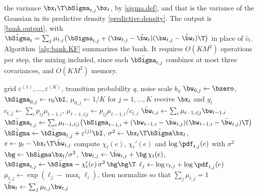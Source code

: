 the variance $\bx_t\T\tilde{\bSigma}_{t,j}\bx_t$, by
\eqref{sigma.def}, and that is the variance of the Gaussian in its
predictive density \eqref{predictive.density}. The output
is \eqref{bank.output}, with
$\hat{\bSigma}_t = \sum_j \mu_{t,j}\big(\bSigma_{t,j}
+ (\bw_{t,j} - \hat{\bw}_t)(\bw_{t,j} - \hat{\bw}_t)\T\big)$
in place of $\hat{v}_t$. Algorithm~\ref{alg:bank.KF} summarizes the
bank. It requires $O(KM^2)$ operations per step, the mixing
included, since each $\bar{\bSigma}_{t,j}$ combines at most three
covariances, and $O(KM^2)$ memory.

\begin{algorithm}[t]
\caption{Bank of KF filters with uncertain random-walk variance}
\label{alg:bank.KF}
\begin{algorithmic}[1]
\Require grid $\varepsilon^{(1)}, \ldots, \varepsilon^{(K)}$,
         transition probability $q$, noise scale $b_\eta$
\State $\bw_{0,j} \gets \bzero$, $\bSigma_{0,j} \gets v_0\bI$,
       $\mu_{0,j} \gets 1/K$ for $j = 1, \ldots, K$
  \State receive $\bx_t$ and $y_t$
    \State $c_{t,j} \gets \sum_i p_{ij}\mu_{t-1,i}$,\;
           $\mu_{t-1,i|j} \gets p_{ij}\mu_{t-1,i}/c_{t,j}$
    \State $\bar{\bw}_{t,j} \gets \sum_i \mu_{t-1,i|j}\bw_{t-1,i}$
    \State $\bar{\bSigma}_{t,j} \gets \sum_i \mu_{t-1,i|j}
           \big(\bSigma_{t-1,i}
           + (\bw_{t-1,i}-\bar{\bw}_{t,j})(\bw_{t-1,i}-\bar{\bw}_{t,j})\T\big)$
  \EndFor
    \State $\tilde{\bSigma} \gets \bar{\bSigma}_{t,j} + \varepsilon^{(j)}\bI$,\;
           $\sigma^2 \gets \bx_t\T\tilde{\bSigma}\bx_t$,\;
           $e \gets y_t - \bx_t\T\bar{\bw}_{t,j}$
    \State compute $\chi_t(e)$, $\chi_t'(e)$ and
           $\log\pdf_{t,j}(e)$ with $\sigma^2$
           \Comment{\eqref{Lap.chi}, \eqref{bank.weights}}
    \State $\bg \gets \tilde{\bSigma}\bx_t/\sigma^2$,\;
           $\bw_{t,j} \gets \bar{\bw}_{t,j} + \bg\,\chi_t(e)$,\;
           $\bSigma_{t,j} \gets \tilde{\bSigma} - \chi_t'(e)\,\sigma^2\,\bg\bg\T$
    \State $\ell_j \gets \log c_{t,j} + \log\pdf_{t,j}(e)$
  \EndFor
  \State $\mu_{t,j} \gets \exp(\ell_j - \max_i \ell_i)$, then
         normalize so that $\sum_j \mu_{t,j} = 1$
  \State $\hat{\bw}_t \gets \sum_j \mu_{t,j}\bw_{t,j}$
\EndFor
\end{algorithmic}
\end{algorithm}

